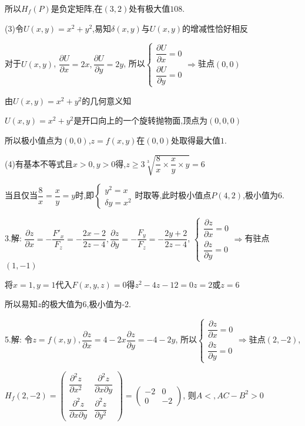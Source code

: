   所以$H_f(P)$是负定矩阵,在$(3,2)$处有极大值$108$.

  (3)令$U(x,y)=x^2+y^2$,易知$\delta(x,y)$与$U(x,y)$的增减性恰好相反

  对于$U(x,y)$, $\dfrac{{\partial U}}{{\partial x}} = 2x,\dfrac{{\partial U}}{{\partial y}} = 2y$,
  所以$\begin{cases}\dfrac{{\partial U}}{{\partial x}} =0\\\dfrac{{\partial U}}{{\partial y}} =0\end{cases}\Rightarrow$驻点$(0,0)$

  由$U(x,y)=x^2+y^2$的几何意义知

  $U(x,y)=x^2+y^2$是开口向上的一个旋转抛物面,顶点为$(0,0,0)$

  所以极小值点为$(0,0)$,$z=f(x,y)$在$(0,0)$处取得最大值$1$.

  (4)有基本不等式且$x>0,y>0$得,$z \ge 3\sqrt[3]{{\dfrac{8}{x} \times \dfrac{x}{y} \times y}} = 6$

  当且仅当$\dfrac{8}{x} = \dfrac{x}{y} = y$时,即$\begin{cases}y^2=x\\\delta y=x^2\end{cases}$时取等,此时极小值点$P(4,2)$,极小值为$6$.

  3.解: $\dfrac{{\partial z}}{{\partial x}} =  - \dfrac{F'_x}{F_z} =  - \dfrac{{2x - 2}}{{2z - 4}},\dfrac{{\partial z}}{{\partial y}} =  - \dfrac{F_y}{F_z} =  - \dfrac{{2y + 2}}{{2z - 4}}$,
  $\begin{cases}\dfrac{{\partial z}}{{\partial x}} = 0\\\dfrac{{\partial z}}{{\partial y}} = 0 \end{cases} \Rightarrow$有驻点$(1,-1)$

    将$x=1,y=1$代入$F(x,y,z)=0$得$z^2-4z-12=0  z=2$或$z=6$

    所以易知$z$的极大值为6,极小值为-2.

    5.解: 令$z=f(x,y), \dfrac{{\partial z}}{{\partial x}} = 4-2x \dfrac{{\partial z}}{{\partial y}} =-4-2y$,
    所以$\begin{cases} \dfrac{{\partial z}}{{\partial x}} = 0\\\dfrac{{\partial z}}{{\partial y}} = 0 \end{cases} \Rightarrow$驻点$(2,-2)$,

    $H_f(2,-2)=\left( {\begin{array}{*{20}{c}}
      {\dfrac{{\partial^2 z}}{{\partial x^2}}}&{\dfrac{{\partial^2 z}}{{\partial x\partial y}}}\\
      {\dfrac{{\partial^2 z}}{{\partial x\partial y}}}&{\dfrac{{\partial^2 z}}{{\partial y^2}}}
      \end{array}} \right)=\left( {\begin{array}{*{20}{c}}
      { - 2}&0\\
      0&{ - 2}
      \end{array}} \right)$,
    则$A<,AC-B^2>0$

